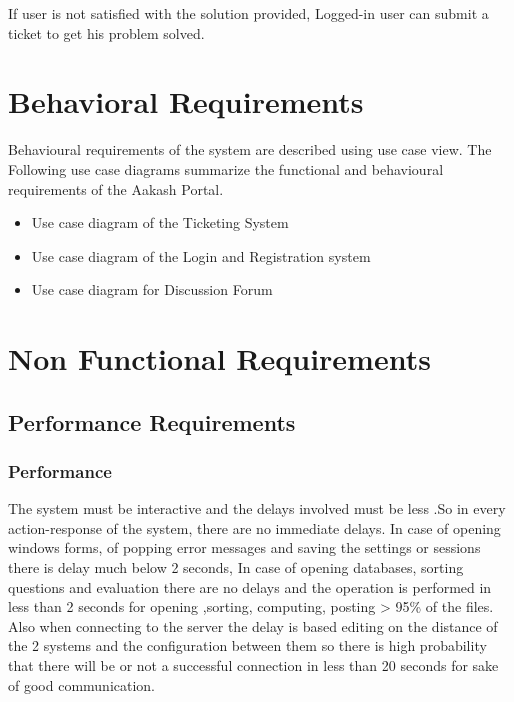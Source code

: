 \documentclass[letterpaper,10pt,english]{sphinxmanual}
\begin{document}
If user is not satisfied with the solution provided, Logged-in user can submit a ticket to get his problem solved.


\chapter{Behavioral Requirements}
\label{behavreq::doc}\label{behavreq:behavioral-requirements}
Behavioural requirements of the system are described using use case view. The Following use case diagrams summarize the functional and behavioural requirements of the Aakash Portal.
\begin{itemize}
\item {} 
Use case diagram of the Ticketing System

\item {} 
Use case diagram of the Login and Registration system

\item {} 
Use case diagram for Discussion Forum

\end{itemize}


\chapter{Non Functional Requirements}
\label{nonfunc::doc}\label{nonfunc:non-functional-requirements}

\section{Performance Requirements}
\label{nonfunc:performance-requirements}

\subsection{Performance}
\label{nonfunc:performance}
The system must be interactive and the delays involved must be less .So in every action-response of the system, there are no immediate delays. In case of opening windows forms, of popping error messages and saving the settings or sessions there is delay much below 2 seconds, In case of opening databases, sorting questions and evaluation there are no delays and the operation is performed in less than 2 seconds for opening ,sorting, computing, posting \textgreater{} 95\% of the files. Also when connecting to the server the delay is based editing on the distance of the 2 systems and the configuration between them so there is high probability that there will be or not a successful connection in less than 20 seconds for sake of good communication.
\end{document}
